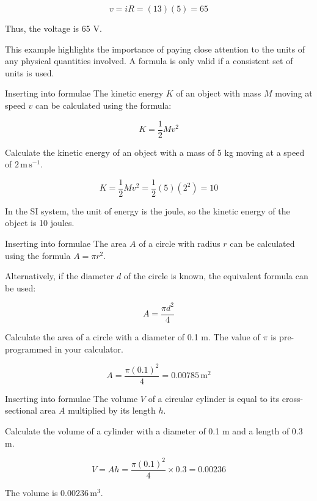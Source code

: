 \[
v = iR = (13)(5) = 65
\]

Thus, the voltage is 65 V.

This example highlights the importance of paying close attention to the units of any physical quantities involved. A formula is only valid if a consistent set of units is used.

\begin{example} Inserting into formulae \newline
The kinetic energy \(K\) of an object with mass \(M\) moving at speed \(v\) can be calculated using the formula:

\[
K = \frac{1}{2}Mv^2
\]

Calculate the kinetic energy of an object with a mass of 5 kg moving at a speed of \(2 \, \text{m} \, \text{s}^{-1}\).

\begin{solution}
\[
K = \frac{1}{2}Mv^2 = \frac{1}{2}(5)(2^2) = 10
\] 

\end{solution}

In the SI system, the unit of energy is the joule, so the kinetic energy of the object is 10 joules.
\end{example}

\begin{example} Inserting into formulae \newline
The area \(A\) of a circle with radius \(r\) can be calculated using the formula \(A = \pi r^2\).

Alternatively, if the diameter \(d\) of the circle is known, the equivalent formula can be used:

\[
A = \frac{\pi d^2}{4}
\]

Calculate the area of a circle with a diameter of 0.1 m. The value of \(\pi\) is pre-programmed in your calculator.

\begin{solution}
    \[
A = \frac{\pi (0.1)^2}{4} = 0.00785 \, \text{m}^2
\]

\end{solution}


\end{example}

\begin{example} Inserting into formulae \newline
The volume \(V\) of a circular cylinder is equal to its cross-sectional area \(A\) multiplied by its length \(h\).

Calculate the volume of a cylinder with a diameter of 0.1 m and a length of 0.3 m.

\begin{solution}
  \[
V = Ah = \frac{\pi (0.1)^2}{4} \times 0.3 = 0.00236
\]

The volume is \(0.00236 \, \text{m}^3\).
\end{solution}
\end{example}

